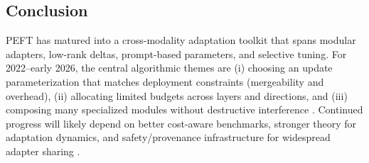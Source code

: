 \documentclass[conference]{IEEEtran}
\begin{document}
\subsection{Conclusion}
PEFT has matured into a cross-modality adaptation toolkit that spans modular adapters, low-rank deltas, prompt-based parameters, and selective tuning. For 2022--early 2026, the central algorithmic themes are (i) choosing an update parameterization that matches deployment constraints (mergeability and overhead), (ii) allocating limited budgets across layers and directions, and (iii) composing many specialized modules without destructive interference \cite{hu2021lora,zhang2023adalora,yadav2023ties,han2024parameter}. Continued progress will likely depend on better cost-aware benchmarks, stronger theory for adaptation dynamics, and safety/provenance infrastructure for widespread adapter sharing \cite{prottasha2025peft,si2024task,taraghi2025efficiency}.

\label{ReferencesStart}
  
\end{document}
